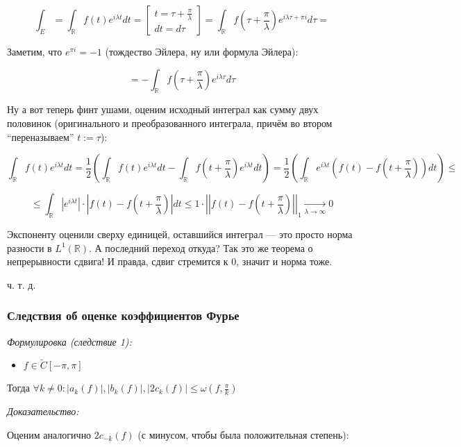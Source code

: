 \documentclass{article}
\def\goesto#1{\underset{#1}{\longrightarrow}}
\begin{document}
\[\int_{E} = \int_{\mathbb{R}} f(t) e^{i \lambda t} dt = \begin{bmatrix}
    t = \tau + \frac{\pi}{\lambda}\\
    dt = d\tau
\end{bmatrix} = \int_{\mathbb{R}} f\left(\tau + \frac{\pi}{\lambda}\right) e^{i\lambda \tau + \pi i} d\tau =\]

Заметим, что $e^{\pi i } = -1$ (тождество Эйлера, ну или формула Эйлера):

\[= -\int_{\mathbb{R}} f\left(\tau + \frac{\pi}{\lambda}\right) e^{i\lambda \tau } d\tau\]

Ну а вот теперь финт ушами, оценим исходный интеграл как сумму двух половинок (оригинального и преобразованного интеграла, причём во втором ``переназываем'' $t := \tau$):

\[\int_{\mathbb{R}} f(t) e^{i \lambda t} dt = \frac{1}{2} \left(\int_{\mathbb{R}} f(t) e^{i \lambda t} dt - \int_{\mathbb{R}} f\left(t + \frac{\pi}{\lambda}\right)e^{i \lambda t} dt\right) = \frac{1}{2} \left(\int_{\mathbb{R}} e^{i \lambda t} \left(f(t) -  f\left(t + \frac{\pi}{\lambda}\right)\right) dt\right) \le\] 

\[ \le \int_{\mathbb{R}} |e^{i \lambda t}| \cdot \left|f(t) -  f\left(t + \frac{\pi}{\lambda}\right)\right| dt \le 1 \cdot \left|\left|f(t) - f\left(t + \frac{\pi}{\lambda}\right)\right|\right|_1 \goesto{\lambda \rightarrow \infty} 0 \]

Экспоненту оценили сверху единицей, оставшийся интеграл --- это просто норма разности в $L^1(\mathbb{R})$. А последний переход откуда? Так это же теорема о непрерывности сдвига! И правда, сдвиг стремится к 0, значит и норма тоже.

ч. т. д. 

\subsubsection{Следствия об оценке коэффициентов Фурье}
\textit{Формулировка (следствие 1):}

\begin{itemize}
    \item $f \in \tilde{C}[-\pi, \pi]$
\end{itemize}

Тогда $\forall k \neq 0: |a_k(f)|, |b_k(f)|, |2c_k(f)| \le \omega(f, \frac{\pi}{k})$

\textit{Доказательство:}

Оценим аналогично $2c_{-k}(f)$ (с минусом, чтобы была положительная степень):
\end{document}
